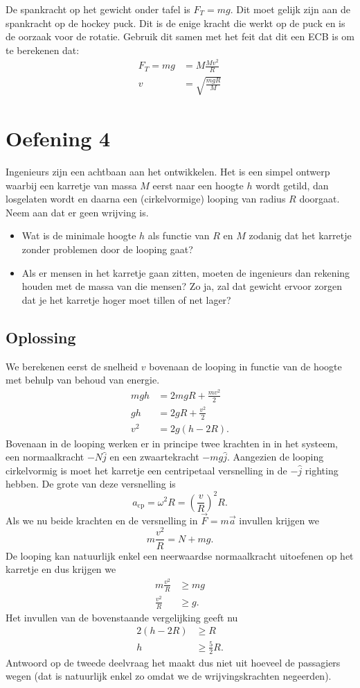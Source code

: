 \documentclass[11pt]{article}
\begin{document}
De spankracht op het gewicht onder tafel is $F_T = mg$. Dit moet gelijk zijn aan de spankracht op de hockey puck.
Dit is de enige kracht die werkt op de puck en is de oorzaak voor de rotatie. Gebruik dit samen met het feit dat dit een ECB is om te berekenen dat:
\begin{align}
	F_T = mg &= M \frac{Mv^2}{R}\\
	v &= \sqrt{\frac{mgR}{M}}
\end{align}
\section{Oefening 4}
Ingenieurs zijn een achtbaan aan het ontwikkelen. Het is een simpel ontwerp waarbij een karretje van massa $M$ eerst naar een hoogte $h$ wordt getild, dan losgelaten wordt en daarna een (cirkelvormige) looping van radius $R$ doorgaat. Neem aan dat er geen wrijving is.
\begin{itemize}
	\item Wat is de minimale hoogte $h$ als functie van $R$ en $M$ zodanig dat het karretje zonder problemen door de looping gaat?
	\item Als er mensen in het karretje gaan zitten, moeten de ingenieurs dan rekening houden met de massa van die mensen? Zo ja, zal dat gewicht ervoor zorgen dat je het karretje hoger moet tillen of net lager?
\end{itemize}
\subsection{Oplossing}
We berekenen eerst de snelheid $v$ bovenaan de looping in functie van de hoogte met behulp van behoud van energie.
\begin{align}
	mg h&=2mgR+\frac{m v^2}{2}\\
	g h&=2gR+\frac{ v^2}{2}\\
	v^2&=2g(h-2R).
\end{align}
Bovenaan in de looping werken er in principe twee krachten in in het systeem, een normaalkracht $-N \hat{j}$ en een zwaartekracht $-mg\hat{j}$. Aangezien de looping cirkelvormig is moet het karretje een centripetaal versnelling in de $-\hat{j}$ righting hebben. De grote van deze versnelling is
\begin{equation}
	a_{\text{cp}}=\omega^2R=\left(\frac{v}{R}\right)^2 R.
\end{equation}
Als we nu beide krachten en de versnelling in $\vec{F}=m\vec{a}$ invullen krijgen we
\begin{equation}
	m\frac{v^2}{R}=N+mg.
\end{equation}
De looping kan natuurlijk enkel een neerwaardse normaalkracht uitoefenen op het karretje en dus krijgen we
\begin{align}
	m\frac{v^2}{R}&\geq mg\\
	\frac{v^2}{R}&\geq g.
\end{align}
Het invullen van de bovenstaande vergelijking geeft nu
\begin{align}
	2(h-2R)&\geq R \\
	h&\geq \frac{5}{2}R.
\end{align}
Antwoord op de tweede deelvraag het maakt dus niet uit hoeveel de passagiers wegen (dat is natuurlijk enkel zo omdat we de wrijvingskrachten negeerden).
\end{document}
